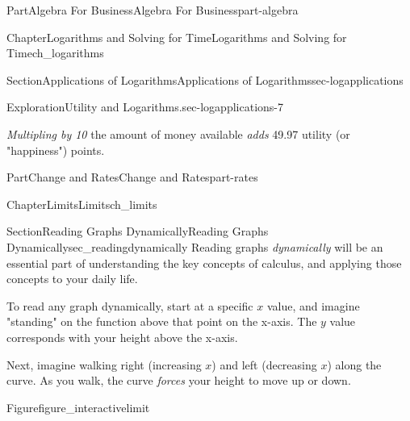 \documentclass{tufte-book}
\numberwithin{equation}{chapter}
\begin{document}
\begin{partptx}{Part}{Algebra For Business}{}{Algebra For Business}{}{}{part-algebra}
\begin{chapterptx}{Chapter}{Logarithms and Solving for Time}{}{Logarithms and Solving for Time}{}{}{ch_logarithms}
\begin{sectionptx}{Section}{Applications of Logarithms}{}{Applications of Logarithms}{}{}{sec-logapplications}
\begin{exploration}{Exploration}{Utility and Logarithms.}{sec-logapplications-7}
\begin{enumerate}[font=\bfseries,label=(\alph*),ref=\alph*]
\emph{Multipling by 10} the amount of money available \emph{adds} 49.97 utility (or "happiness") points.%
\end{enumerate}%
\end{exploration}%
\end{sectionptx}
\end{chapterptx}
\end{partptx}
%
%
\typeout{************************************************}
\typeout{************************************************}
%
\begin{partptx}{Part}{Change and Rates}{}{Change and Rates}{}{}{part-rates}
\renewcommand*{\partname}{Part}
%
\typeout{************************************************}
\typeout{************************************************}
%
\begin{chapterptx}{Chapter}{Limits}{}{Limits}{}{}{ch_limits}
\renewcommand*{\chaptername}{Chapter}
\begin{introduction}{}%
%
\end{introduction}%
%
%
\typeout{************************************************}
\typeout{************************************************}
%
\begin{sectionptx}{Section}{Reading Graphs Dynamically}{}{Reading Graphs Dynamically}{}{}{sec_readingdynamically}
Reading graphs \emph{dynamically} will be an essential part of understanding the key concepts of calculus, and applying those concepts to your daily life.%
\par
To read any graph dynamically, start at a specific \(x\) value, and imagine "standing" on the function above that point on the x-axis. The \(y\) value corresponds with your height above the x-axis.%
\par
Next, imagine walking right (increasing \(x\)) and left (decreasing \(x\)) along the curve. As you walk, the curve \emph{forces} your height to move up or down.%
\begin{figureptx}{Figure}{}{figure_interactivelimit}{}%
\begin{sidebyside}{2}{0.075}{0.075}{0.17}%
\begin{sbspanel}{0.47}%

\end{sbspanel}
\end{sidebyside}
\end{figureptx}
\end{sectionptx}
\end{chapterptx}
\end{partptx}
\end{document}
